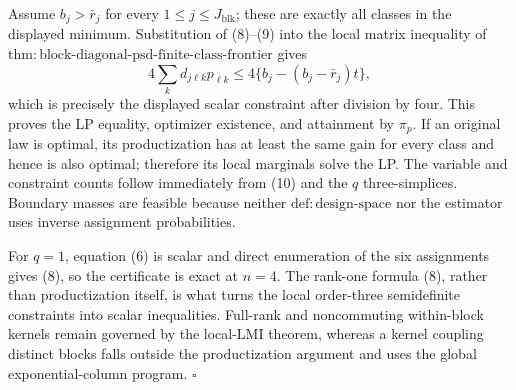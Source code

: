 Assume \(b_j>\bar r_j\) for every \(1\le j\le J_{\mathrm{blk}}\); these are exactly all classes in the displayed minimum. Substitution of (8)--(9) into the local matrix inequality of \(\mathrm{thm:block\text{-}diagonal\text{-}psd\text{-}finite\text{-}class\text{-}frontier}\) gives
\[
4\sum_kd_{j\ell k}p_{\ell k}
\le4\{b_j-(b_j-\bar r_j)t\},
\tag{10}
\]
which is precisely the displayed scalar constraint after division by four. This proves the LP equality, optimizer existence, and attainment by \(\pi_p\). If an original law is optimal, its productization has at least the same gain for every class and hence is also optimal; therefore its local marginals solve the LP. The variable and constraint counts follow immediately from (10) and the \(q\) three-simplices. Boundary masses are feasible because neither \(\mathrm{def:design\text{-}space}\) nor the estimator uses inverse assignment probabilities.

For \(q=1\), equation (6) is scalar and direct enumeration of the six assignments gives (8), so the certificate is exact at \(n=4\). The rank-one formula (8), rather than productization itself, is what turns the local order-three semidefinite constraints into scalar inequalities. Full-rank and noncommuting within-block kernels remain governed by the local-LMI theorem, whereas a kernel coupling distinct blocks falls outside the productization argument and uses the global exponential-column program. \(\square\)